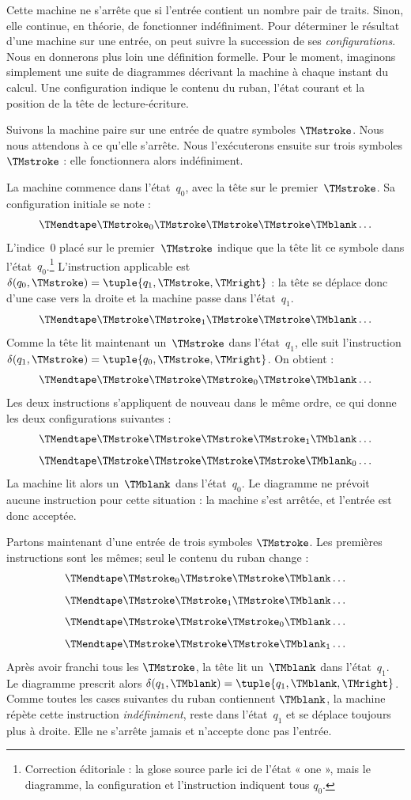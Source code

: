 \documentclass[../../../include/open-logic-section]{subfiles}
\begin{document}
\begin{explain}
Cette machine ne s'arrête que si l'entrée contient
un nombre pair de traits. Sinon, elle continue,
en théorie, de fonctionner indéfiniment. Pour
déterminer le résultat d'une machine sur une entrée,
on peut suivre la succession de ses \emph{configurations}.
Nous en donnerons plus loin une définition formelle.
Pour le moment, imaginons simplement une suite de
diagrammes décrivant la machine à chaque instant
du calcul. Une configuration indique le contenu
du ruban, l'état courant et la position de la
tête de lecture-écriture.

Suivons la machine paire sur une entrée de quatre
symboles $\TMstroke$. Nous nous attendons à ce
qu'elle s'arrête. Nous l'exécuterons ensuite sur
trois symboles $\TMstroke$ : elle fonctionnera
alors indéfiniment.

La machine commence dans l'état~$q_0$, avec la
tête sur le premier~$\TMstroke$. Sa configuration
initiale se note :
\[
\TMendtape \TMstroke_0 \TMstroke \TMstroke \TMstroke \TMblank \ldots
\]
L'indice~$0$ placé sur le premier~$\TMstroke$
indique que la tête lit ce symbole dans l'état~$q_0$.\footnote{Correction éditoriale : la glose source parle ici de l'état « one », mais le diagramme, la configuration et l'instruction indiquent tous $q_0$.}
L'instruction applicable est
$\delta(q_0,\TMstroke)=\tuple{q_1,\TMstroke,\TMright}$ :
la tête se déplace donc d'une case vers la droite
et la machine passe dans l'état~$q_1$.
\[
\TMendtape \TMstroke \TMstroke_1 \TMstroke \TMstroke \TMblank \ldots
\]
Comme la tête lit maintenant un~$\TMstroke$
dans l'état~$q_1$, elle suit l'instruction
$\delta(q_1,\TMstroke)=\tuple{q_0,
  \TMstroke,\TMright}$. On obtient :
\[
\TMendtape \TMstroke \TMstroke \TMstroke_0 \TMstroke \TMblank \ldots
\]
Les deux instructions s'appliquent de nouveau
dans le même ordre, ce qui donne les deux
configurations suivantes :
\[
\TMendtape \TMstroke \TMstroke \TMstroke \TMstroke_1 \TMblank \ldots
\]
\[
\TMendtape \TMstroke \TMstroke \TMstroke \TMstroke \TMblank_0 \ldots
\]
La machine lit alors un~$\TMblank$ dans
l'état~$q_0$. Le diagramme ne prévoit aucune
instruction pour cette situation : la machine
s'est arrêtée, et l'entrée est donc acceptée.

Partons maintenant d'une entrée de trois symboles
$\TMstroke$. Les premières instructions sont les
mêmes; seul le contenu du ruban change :
\[
\TMendtape \TMstroke_0 \TMstroke \TMstroke \TMblank \ldots
\]
\[
\TMendtape \TMstroke \TMstroke_1 \TMstroke \TMblank \ldots
\]
\[
\TMendtape \TMstroke \TMstroke \TMstroke_0 \TMblank \ldots
\]
\[
\TMendtape \TMstroke \TMstroke \TMstroke \TMblank_1 \ldots
\]
Après avoir franchi tous les $\TMstroke$,
la tête lit un~$\TMblank$ dans l'état~$q_1$.
Le diagramme prescrit alors
$\delta(q_1,\TMblank)=\tuple{q_1,
\TMblank,\TMright}$. Comme toutes les cases
suivantes du ruban contiennent $\TMblank$,
la machine répète cette instruction
\emph{indéfiniment}, reste dans l'état~$q_1$
et se déplace toujours plus à droite. Elle
ne s'arrête jamais et n'accepte donc pas l'entrée.
\end{explain}
\end{document}
